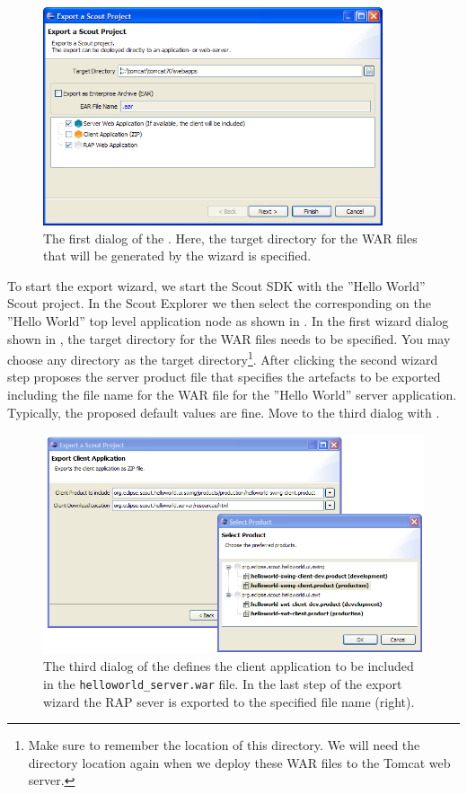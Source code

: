 \documentclass[a4paper,10pt,twoside]{book}
\begin{document}
\begin{figure}
\includegraphics[width=10cm]{export_wizard_1.png}
\caption{The first dialog of the . 
Here, the target directory for the WAR files that will be generated by the wizard is specified.}
\end{figure}

To start the export wizard, we start the Scout SDK with the ''Hello World'' Scout project.
In the Scout Explorer we then select the corresponding  on the ''Hello World'' top level application node as shown in .
In the first wizard dialog shown in , the target directory for the WAR files needs to be specified.
You may choose any directory as the target directory\footnote{
Make sure to remember the location of this directory.
We will need the directory location again when we deploy these WAR files to the Tomcat web server.
}.
After clicking  the second wizard step proposes the server product file that specifies the artefacts to be exported including the file name for the WAR file for the ''Hello World'' server application.
Typically, the proposed default values are fine.
Move to the third dialog with .

\begin{figure}
\includegraphics[width=13cm]{export_wizard_3.png}
\caption{The third dialog of the  defines the client application to be included in the \texttt{helloworld\_server.war} file.
In the last step of the export wizard the RAP sever is exported to the specified file name (right).}
\end{figure}
\end{document}
